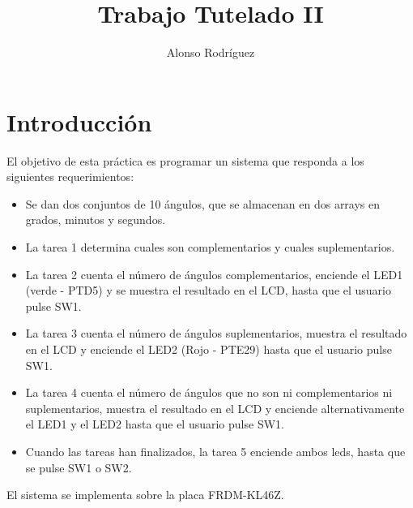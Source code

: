 \documentclass[a4paper,openright,12pt]{article}
\begin{document}
\author {Alonso Rodríguez}
\title {Trabajo Tutelado II}

\maketitle

\justifying{}


\section{Introducción}
El objetivo de esta práctica es programar un sistema que responda a los siguientes requerimientos:
\begin{itemize}    
    \item Se dan dos conjuntos de 10 ángulos, que se almacenan en dos arrays en grados, minutos y segundos.
    \item La tarea 1 determina cuales son complementarios y cuales suplementarios.
    \item La tarea 2 cuenta el número de ángulos complementarios, enciende el LED1 (verde - PTD5) y se muestra el resultado en el LCD, hasta que el usuario pulse SW1.
    \item La tarea 3 cuenta el número de ángulos suplementarios, muestra el resultado en el LCD y enciende el LED2 (Rojo - PTE29) hasta que el usuario pulse SW1.
    \item La tarea 4 cuenta el número de ángulos que no son ni complementarios ni suplementarios, muestra el resultado en el LCD y enciende alternativamente el LED1 y el LED2
          hasta que el usuario pulse SW1.
    \item Cuando las tareas han finalizados, la tarea 5 enciende ambos leds, hasta que se pulse SW1 o SW2.
\end{itemize}

El sistema se implementa sobre la placa FRDM-KL46Z.



\clearpage
\end{document}
